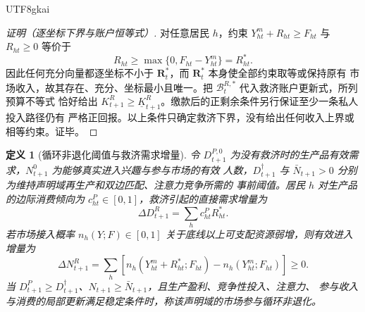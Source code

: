 \documentclass[12pt,a4paper,openany]{report}
\newtheorem{definition}{定义}[chapter]
\begin{document}
\begin{CJK*}{UTF8}{gkai}
\begin{proof}[证明（逐坐标下界与账户恒等式）]
对任意居民 \(h\)，约束 \(Y_{ht}^{m}+R_{ht}\ge F_{ht}\) 与 \(R_{ht}\ge0\) 等价于
\[
  R_{ht}\ge\max\{0,F_{ht}-Y_{ht}^{m}\}=R_{ht}^{*}.
\]
因此任何充分向量都逐坐标不小于 \(\mathbf R_t^*\)，而 \(\mathbf R_t^*\) 本身使全部约束取等或保持原有
市场收入，故其存在、充分、坐标最小且唯一。把 \(\mathcal B_t^{R,*}\) 代入救济账户更新式，所列预算不等式
恰好给出 \(K_{t+1}^R\ge\underline K_{t+1}^R\)。缴款后的正剩余条件另行保证至少一条私人投入路径仍有
严格正回报。以上条件只确定救济下界，没有给出任何收入上界或相等约束。证毕。
\end{proof}

\begin{definition}[循环非退化阈值与救济需求增量]
令 \(D_{t+1}^{P,0}\) 为没有救济时的生产品有效需求，\(N_{t+1}^{0}\) 为能够真实进入兴趣与参与市场的有效
人数，\(D_{t+1}^{\dagger}\) 与 \(\bar N_{t+1}>0\) 分别为维持声明域再生产和双边匹配、注意力竞争所需的
事前阈值。居民 \(h\) 对生产品的边际消费倾向为 \(c_{ht}^{P}\in[0,1]\)，救济引起的直接需求增量为
\[
  \Delta D_{t+1}^{R}
  =\sum_hc_{ht}^{P}R_{ht}^{*}.
\]
若市场接入概率 \(n_h(Y;F)\in[0,1]\) 关于底线以上可支配资源弱增，则有效进入增量为
\[
  \Delta N_{t+1}^{R}
  =\sum_h
  \left[
  n_h(Y_{ht}^{m}+R_{ht}^{*};F_{ht})
  -n_h(Y_{ht}^{m};F_{ht})
  \right]\ge0.
\]
当 \(D_{t+1}^P\ge D_{t+1}^{\dagger}\)、\(N_{t+1}\ge\bar N_{t+1}\)，且生产盈利、竞争性投入、注意力、
参与收入与消费的局部更新满足稳定条件时，称该声明域的市场参与循环非退化。
\end{definition}


\end{CJK*}
\end{document}
